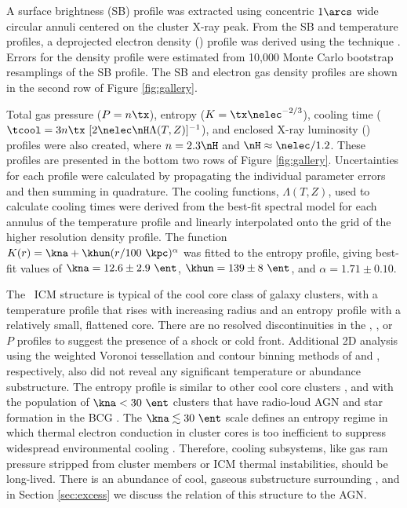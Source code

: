 \documentclass[useAMS,usenatbib]{mn2e}
\begin{document}
A surface brightness (SB) profile was extracted using concentric
$1\arcs$ wide circular annuli centered on the cluster X-ray peak. From
the SB and temperature profiles, a deprojected electron density
(\nelec) profile was derived using the \citet{kriss83} technique
\citep[see][for more detail]{accept}. Errors for the density profile
were estimated from 10,000 Monte Carlo bootstrap resamplings of the SB
profile. The SB and electron gas density profiles are shown in the
second row of Figure \ref{fig:gallery}.

Total gas pressure ($P = n \tx$), entropy ($K = \tx\nelec^{-2/3}$),
cooling time ($\tcool = 3n\tx~[2\nelec \nH \Lambda(T,Z)]^{-1}$), and
enclosed X-ray luminosity (\lx) profiles were also created, where $n =
2.3 \nH$ and $\nH \approx \nelec/1.2$. These profiles are presented in
the bottom two rows of Figure \ref{fig:gallery}. Uncertainties for
each profile were calculated by propagating the individual parameter
errors and then summing in quadrature. The cooling functions,
$\Lambda(T,Z)$, used to calculate cooling times were derived from the
best-fit spectral model for each annulus of the temperature profile
and linearly interpolated onto the grid of the higher resolution
density profile. The function $K(r) = \kna +\khun (r/100
~\kpc)^{\alpha}$ was fitted to the entropy profile, giving best-fit
values of $\kna = 12.6 \pm 2.9 ~\ent$, $\khun = 139 \pm 8 ~\ent$, and
$\alpha = 1.71 \pm 0.10$.

The \rxj\ ICM structure is typical of the cool core class of galaxy
clusters, with a temperature profile that rises with increasing radius
and an entropy profile with a relatively small, flattened core. There
are no resolved discontinuities in the \tx, \nelec, or $P$ profiles to
suggest the presence of a shock or cold front. Additional 2D analysis
using the weighted Voronoi tessellation and contour binning methods of
\citet{wvt} and \citet{2006MNRAS.371..829S}, respectively, also did
not reveal any significant temperature or abundance substructure. The
entropy profile is similar to other cool core clusters \citep{accept},
and with the population of $\kna < 30 ~\ent$ clusters that have
radio-loud AGN and star formation in the BCG \citep{haradent,
  rafferty08}. The $\kna \la 30 ~\ent$ scale defines an entropy regime
in which thermal electron conduction in cluster cores is too
inefficient to suppress widespread environmental cooling
\citep{conduction}. Therefore, cooling subsystems, like gas ram
pressure stripped from cluster members or ICM thermal instabilities,
should be long-lived. There is an abundance of cool, gaseous
substructure surrounding \irs, and in Section \ref{sec:excess} we
discuss the relation of this structure to the AGN.
\end{document}

